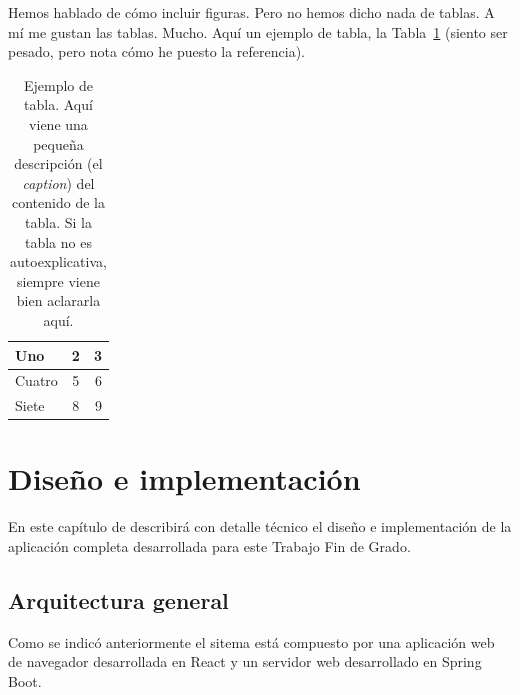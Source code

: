 \documentclass[a4paper, 12pt]{book}
\begin{document}
Hemos hablado de cómo incluir figuras.
Pero no hemos dicho nada de tablas.
A mí me gustan las tablas.
Mucho.
Aquí un ejemplo de tabla, la Tabla~\ref{tabla:ejemplo} (siento ser pesado, pero nota cómo he puesto la referencia).

\begin{table}
 \begin{center}
  \begin{tabular}{ | l | c | r |} %
    \hline
    Uno & 2 & 3 \\ \hline %
    Cuatro & 5 & 6 \\ \hline
    Siete & 8 & 9 \\
    \hline
  \end{tabular}
  \label{tabla:ejemplo}
  \caption{Ejemplo de tabla. Aquí viene una pequeña descripción (el \emph{caption}) del contenido de la tabla. Si la tabla no es autoexplicativa, siempre viene bien aclararla aquí.}
 \end{center}
\end{table}




\cleardoublepage
\chapter{Diseño e implementación}

En este capítulo de describirá con detalle técnico el diseño e implementación de la aplicación completa desarrollada para este Trabajo Fin de Grado.

\section{Arquitectura general} 
\label{sec:architecture}

Como se indicó anteriormente el sitema está compuesto por una aplicación web de navegador desarrollada en React y un servidor web desarrollado en Spring Boot. 
\end{document}

